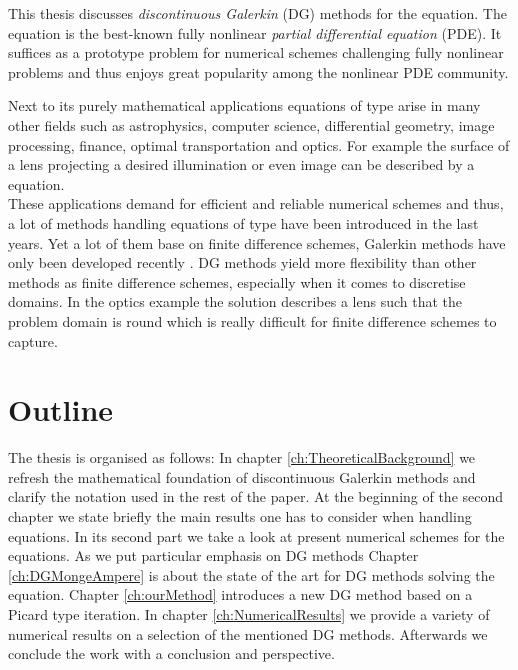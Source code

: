 This thesis discusses \emph{discontinuous Galerkin} (DG) methods for the \MA equation. 
The \MA equation is the best-known fully nonlinear \emph{partial differential equation} (PDE). It suffices as a prototype problem for numerical schemes challenging fully nonlinear problems and thus enjoys great popularity among the nonlinear PDE community.

Next to its purely mathematical applications equations of \MA type arise in many other fields such as astrophysics, computer science, differential geometry, image processing, finance, optimal transportation and optics\cite{FGN2013}. 
For example the surface of a lens projecting a desired illumination or even image can be described by a \MA equation\cite{KW2010, BHP2014}. \\
These applications demand for efficient and reliable numerical schemes and thus, a lot of methods handling equations of \MA type have been introduced in the last years. Yet a lot of them base on finite difference schemes, Galerkin methods have only been developed recently \cite{Boehmer2008, FN2009a, Awanou2010, BGN+2011, Neilan2014}. DG methods yield more flexibility than other methods as finite difference schemes, especially when it comes to discretise domains. In the optics example the solution describes a lens such that the problem domain is round which is really difficult for finite difference schemes to capture.

\section*{Outline}
The thesis is organised as follows: In chapter \ref{ch:TheoreticalBackground} we refresh the mathematical foundation of discontinuous Galerkin methods and clarify the notation used in the rest of the paper.
At the beginning of the second chapter we state briefly the main results one has to consider when handling \MA equations. In its second part we take a look at present numerical schemes for the \MA equations. As we put particular emphasis on DG methods Chapter \ref{ch:DGMongeAmpere} is about the state of the art for DG methods solving the \MA equation.
Chapter \ref{ch:ourMethod} introduces a new DG method based on a Picard type iteration. In chapter \ref{ch:NumericalResults} we provide a variety of numerical results on a selection of the mentioned DG methods.
Afterwards we conclude the work with a conclusion and perspective.